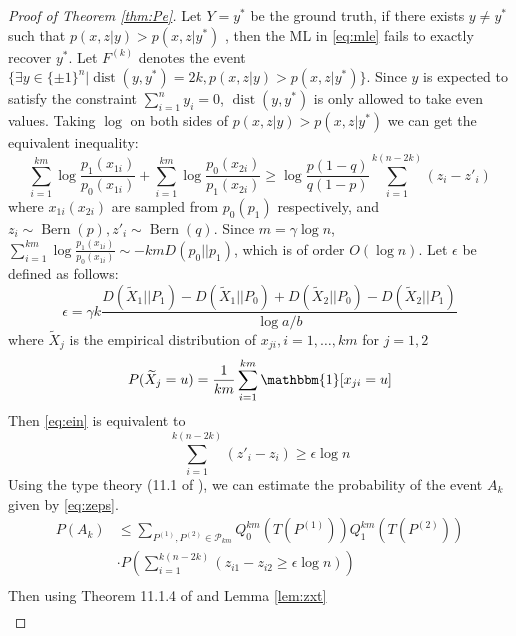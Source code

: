 \documentclass[conference]{IEEEtran}
\DeclareMathOperator{\dist}{dist}
\DeclareMathOperator{\Bern}{Bern}
\begin{document}
	\begin{proof}[Proof of Theorem \ref{thm:Pe}]
		Let $Y=y^*$ be the ground truth, if there exists $y\neq y^*$ such that $p(x,z|y) > p(x,z|y^*)$	,
		then the ML in \eqref{eq:mle} fails to exactly recover $y^*$. Let $F^{(k)}$ denotes
		the event $\{\exists y \in \{\pm 1\}^n | \dist(y, y^*)=2k, p(x,z|y) > p(x,z|y^*) \}$. Since
		$y$ is expected to satisfy the constraint $\sum_{i=1}^n y_i=0$, $\dist(y, y^*)$ is only allowed to take even
		values. Taking $\log$ on both sides of $p(x,z|y) > p(x,z|y^*)$ we can get the equivalent inequality:
		\begin{equation}\label{eq:ein}
		\sum_{i=1}^{km} \log \frac{p_1(x_{1i})}{p_0(x_{1i})}
		+\sum_{i=1}^{km} \log \frac{p_0(x_{2i})}{p_1(x_{2i})}
		\geq \log \frac{p(1-q)}{q(1-p)} \sum_{i=1}^{k(n-2k)}(z_{i} - z'_{i})
		\end{equation}
		where $x_{1i}(x_{2i})$ are sampled from $p_0(p_1)$ respectively,
		and $z_{i} \sim \Bern(p), z'_{i} \sim \Bern(q)$.
		Since $m=\gamma \log n$, $\sum_{i=1}^{km} \log \frac{p_1(x_{1i})}{p_0(x_{1i})} \sim
		-km D(p_0 || p_1)$, which is of order $O(\log n)$.
		Let $\epsilon$ be defined as follows:
		\begin{equation}
		\epsilon = \gamma k\frac{D(\widetilde{X}_1 || P_1) - D(\widetilde{X}_1 || P_0) + D(\widetilde{X}_2 || P_0) - D(\widetilde{X}_2 || P_1)}{\log a /b}
		\end{equation}
		where $\widetilde{X}_j$ is the empirical distribution of $x_{ji},i=1,\dots,km$
		for $j=1,2$
		\begin{equation*}
		P(\widetilde{X}_j = u) = \frac{1}{km} \sum_{i=1}^{km} \mathbbm{1}[x_{ji} = u]
		\end{equation*}
		Then \eqref{eq:ein} is equivalent to
		\begin{equation}\label{eq:zeps}
		\sum_{i=1}^{k(n-2k)}(z'_{i} - z_{i}) \geq \epsilon \log n
		\end{equation}
		Using the type theory (11.1 of \cite{cover1999elements}), we can estimate the probability of the event $A_k$ given by \eqref{eq:zeps}.
		\begin{align*}
		P(A_k) &\leq \sum_{P^{(1)},P^{(2)}\in \mathcal{P}_{km}} Q_0^{km}(T(P^{(1)}))Q_1^{km}(T(P^{(2)}))\\
		& \cdot P(\sum_{i=1}^{k(n-2k)} (z_{i1} - z_{i2} \geq \epsilon \log n )) \\
		\end{align*}
		Then using Theorem 11.1.4 of \cite{cover1999elements} and Lemma \ref{lem:zxt} 
		\begin{align*}

\end{align*}
\end{proof}
\end{document}
